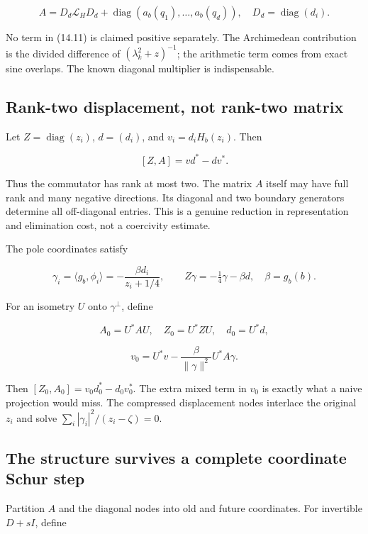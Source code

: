 \documentclass[
  10pt,
  a4paper,
  10pt,
  oneside,
  openany]{book}
\begin{document}
\[
A=D_d\mathcal L_HD_d+
\operatorname{diag}(a_b(q_1),\ldots,a_b(q_d)),
\quad D_d=\operatorname{diag}(d_i).
\tag{14.11}\label{eq:14.11}
\]

No term in (14.11) is claimed positive separately. The Archimedean
contribution is the divided difference of \((\lambda_k^2+z)^{-1}\); the
arithmetic term comes from exact sine overlaps. The known diagonal
multiplier is indispensable.

\subsection{Rank-two displacement, not rank-two
matrix}\label{rank-two-displacement-not-rank-two-matrix}

Let \(Z=\operatorname{diag}(z_i)\), \(d=(d_i)\), and
\(v_i=d_iH_b(z_i)\). Then

\[
[Z,A]=vd^*-dv^*.
\tag{14.12}\label{eq:14.12}
\]

Thus the commutator has rank at most two. The matrix \(A\) itself may
have full rank and many negative directions. Its diagonal and two
boundary generators determine all off-diagonal entries. This is a
genuine reduction in representation and elimination cost, not a
coercivity estimate.

The pole coordinates satisfy

\[
\gamma_i=\langle g_b,\phi_i\rangle
=-\frac{\beta d_i}{z_i+1/4},
\qquad Z\gamma=-\tfrac14\gamma-\beta d,
\quad\beta=g_b(b).
\tag{14.13}\label{eq:14.13}
\]

For an isometry \(U\) onto \(\gamma^\perp\), define

\[
A_0=U^*AU,
\quad Z_0=U^*ZU,
\quad d_0=U^*d,
\tag{14.14}\label{eq:14.14}
\]

\[
v_0=U^*v-\frac{\beta}{\|\gamma\|^2}U^*A\gamma.
\tag{14.15}\label{eq:14.15}
\]

Then \([Z_0,A_0]=v_0d_0^*-d_0v_0^*\). The extra mixed term in \(v_0\) is
exactly what a naive projection would miss. The compressed displacement
nodes interlace the original \(z_i\) and solve
\(\sum_i|\gamma_i|^2/(z_i-\zeta)=0\).

\subsection{The structure survives a complete coordinate Schur
step}\label{the-structure-survives-a-complete-coordinate-schur-step}

Partition \(A\) and the diagonal nodes into old and future coordinates.
For invertible \(D+sI\), define
\end{document}
